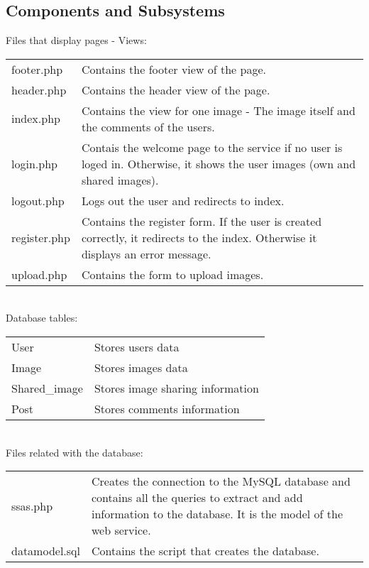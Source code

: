 \documentclass{article}
\begin{document}
\subsection{Components and Subsystems}
Files that display pages - Views: \\
{
\begin{tabular}{ |p{3cm}|p{9cm}| }
\hline
footer.php & Contains the footer view of the page. \\
header.php & Contains the header view of the page. \\
index.php & Contains the view for one image - The image itself and the comments of the users. \\
login.php & Contais the welcome page to the service if no user is loged in. Otherwise, it shows the user images (own and shared images). \\
logout.php & Logs out the user and redirects to index. \\
register.php & Contains the register form. If the user is created correctly, it redirects to the index. Otherwise it displays an error message. \\
upload.php & Contains the form to upload images. \\
\hline
\end{tabular}
}
\ \\
\newline
Database tables:\\
{
\begin{tabular}{ |p{3cm}|p{9cm}| }
\hline
User & Stores users data \\
Image & Stores images data \\
Shared\_image & Stores image sharing information \\
Post & Stores comments information \\ 
\hline
\end{tabular}
}
\ \\
\newline
Files related with the database:\\
{
\begin{tabular}{ |p{3cm}|p{9cm}| }
\hline
ssas.php & Creates the connection to the MySQL database and contains all the queries to extract and add information to the database. It is the model of the web service. \\
datamodel.sql & Contains the script that creates the database. \\
\hline
\end{tabular}
}
\end{document}
